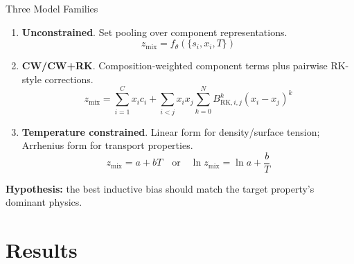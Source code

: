 \documentclass[aspectratio=169,10pt]{beamer}
\newcommand{\best}[1]{\textcolor{SaltTeal}{\textbf{#1}}}
\newcommand{\watchout}[1]{\textcolor{SaltOrange}{\textbf{#1}}}
\newcommand{\zmix}{z_{\mathrm{mix}}}
\begin{document}
\begin{frame}{Three Model Families}
  \begin{enumerate}
    \item \best{Unconstrained}. Set pooling over component representations.
      \[
        \zmix=f_\theta(\{s_i,x_i,T\})
      \]

    \item \best{CW/CW+RK}. Composition-weighted component terms plus pairwise RK-style corrections.
      \[
        \zmix
        =
        \sum_{i=1}^{C}x_i c_i
        +
        \sum_{i<j}x_i x_j
        \sum_{k=0}^{N}B^k_{\mathrm{RK},i,j}(x_i-x_j)^k
      \]

    \item \best{Temperature constrained}. Linear form for density/surface tension; Arrhenius form for transport properties.
      \[
        \zmix=a+bT
        \quad \mathrm{or} \quad
        \ln \zmix=\ln a+\frac{b}{T}
      \]
  \end{enumerate}

  \begin{center}
    \small \watchout{Hypothesis:} the best inductive bias should match the target property's dominant physics.
  \end{center}
\end{frame}

\section{Results}
\end{document}
